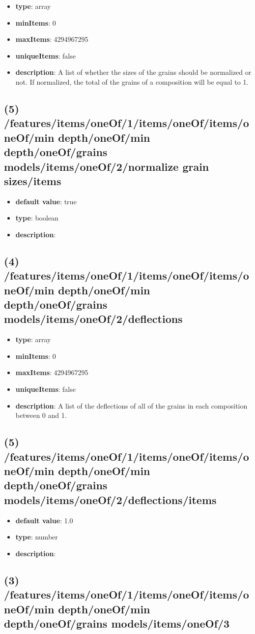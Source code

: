 \begin{itemize}[leftmargin=4em]\item {\bf type}: array
\item {\bf minItems}: 0
\item {\bf maxItems}: 4294967295
\item {\bf uniqueItems}: false
\item {\bf description}: A list of whether the sizes of the grains should be normalized or not. If normalized, the total of the grains of a composition will be equal to 1.
\end{itemize}\subsection{(5) /features/items/oneOf/1/items/oneOf/items/oneOf/min depth/oneOf/min depth/oneOf/grains models/items/oneOf/2/normalize grain sizes/items}
\begin{itemize}[leftmargin=5em]\item {\bf default value}: true
\item {\bf type}: boolean
\item {\bf description}: 
\end{itemize}\subsection{(4) /features/items/oneOf/1/items/oneOf/items/oneOf/min depth/oneOf/min depth/oneOf/grains models/items/oneOf/2/deflections}
\begin{itemize}[leftmargin=4em]\item {\bf type}: array
\item {\bf minItems}: 0
\item {\bf maxItems}: 4294967295
\item {\bf uniqueItems}: false
\item {\bf description}: A list of the deflections of all of the grains in each composition between 0 and 1.
\end{itemize}\subsection{(5) /features/items/oneOf/1/items/oneOf/items/oneOf/min depth/oneOf/min depth/oneOf/grains models/items/oneOf/2/deflections/items}
\begin{itemize}[leftmargin=5em]\item {\bf default value}: 1.0
\item {\bf type}: number
\item {\bf description}: 
\end{itemize}\subsection{(3) /features/items/oneOf/1/items/oneOf/items/oneOf/min depth/oneOf/min depth/oneOf/grains models/items/oneOf/3}
